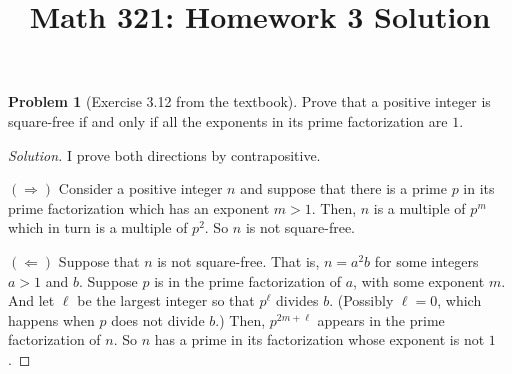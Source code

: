 \documentclass[10pt]{amsart}
\title{Math 321: Homework 3 Solution}
\theoremstyle{definition}
\newtheorem{problem}{Problem}
\begin{document}
\maketitle

\setcounter{problem}{3}
\begin{problem}[Exercise 3.12 from the textbook]
Prove that a positive integer is square-free if and only if all the exponents in its prime factorization are $1$.
\end{problem}

\begin{proof}[Solution]
I prove both directions by contrapositive.

$(\Rightarrow)$ Consider a positive integer $n$ and suppose that there is a prime $p$ in its prime factorization which has an exponent $m>1$. Then, $n$ is a multiple of $p^m$ which in turn is a multiple of $p^2$. So $n$ is not square-free.

$(\Leftarrow)$ Suppose that $n$ is not square-free. That is, $n = a^2b$ for some integers $a > 1$ and $b$. Suppose $p$ is in the prime factorization of $a$, with some exponent $m$. And let $\ell$ be the largest integer so that $p^\ell$ divides $b$. (Possibly $\ell = 0$, which happens when $p$ does not divide $b$.) Then, $p^{2m+\ell}$ appears in the prime factorization of $n$. So $n$ has a prime in its factorization whose exponent is not $1$.
\end{proof}
\end{document}
